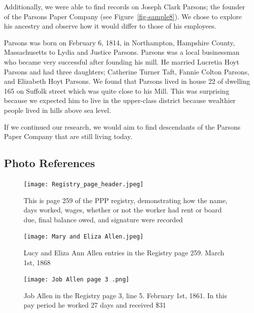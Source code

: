 \documentclass[
  letterpaper,
  DIV=11,
  numbers=noendperiod]{scrartcl}
\begin{document}
Additionally, we were able to find records on Joseph Clark Parsons; the
founder of the Parsons Paper Company (see Figure~\ref{fig-sample8}). We
chose to explore his ancestry and observe how it would differ to those
of his employees.

Parsons was born on February 6, 1814, in Northampton, Hampshire County,
Massachusetts to Lydia and Justice Parsons. Parsons was a local
businessman who became very successful after founding his mill. He
married Lucretia Hoyt Parsons and had three daughters; Catherine Turner
Taft, Fannie Colton Parsons, and Elizabeth Hoyt Parsons. We found that
Parsons lived in house 22 of dwelling 165 on Suffolk street which was
quite close to his Mill. This was surprising because we expected him to
live in the upper-class district because wealthier people lived in hills
above sea level.

If we continued our research, we would aim to find descendants of the
Parsons Paper Company that are still living today.

\hypertarget{photo-references}{%
\subsection{Photo References}\label{photo-references}}

\begin{figure}

{\centering \texttt{[image: Registry\_page\_header.jpeg]}

}

\caption{\label{fig-sample1}This is page 259 of the PPP registry,
demonstrating how the name, days worked, wages, whether or not the
worker had rent or board due, final balance owed, and signature were
recorded}

\end{figure}

\begin{figure}

{\centering \texttt{[image: Mary and Eliza Allen.jpeg]}

}

\caption{\label{fig-sample2}Lucy and Eliza Ann Allen entries in the
Registry page 259. March 1st, 1868}

\end{figure}

\begin{figure}

{\centering \texttt{[image: Job Allen page 3 .png]}

}

\caption{\label{fig-sample3}Job Allen in the Registry page 3, line 5.
February 1st, 1861. In this pay period he worked 27 days and received
\$31}

\end{figure}
\end{document}

